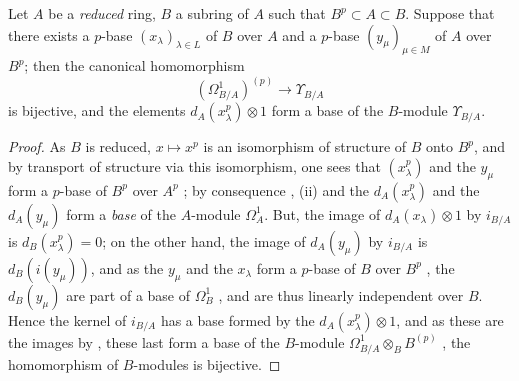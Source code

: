 \begin{proposition}[21.3.5]
\label{0.21.3.5}
Let $A$ be a \emph{reduced} ring, $B$ a subring of $A$ such that $B^p\subset A\subset B$.
Suppose that there exists a $p$-base $(x_\lambda)_{\lambda\in L}$ of $B$ over $A$ and a $p$-base $(y_\mu)_{\mu\in M}$ of $A$ over $B^p$; then the canonical homomorphism 
\begin{equation}
\tag{21.3.5.1}
  \label{0.21.3.5.1}
  (\Omega^1_{B/A})^{(p)}\to\Upsilon_{B/A}
\end{equation}
is bijective, and the elements $d_A(x^p_\lambda)\otimes 1$ form a base of the $B$-module $\Upsilon_{B/A}$.
\end{proposition}

\begin{proof}
As $B$ is reduced, $x\mapsto x^p$ is an isomorphism of structure of $B$ onto $B^p$, and by transport of structure via this isomorphism, one sees that $(x^p_\lambda)$ and the $y_\mu$ form a $p$-base of $B^p$ over $A^p$ ; by consequence , (ii) and  the $d_A(x^p_\lambda)$ and the $d_A(y_\mu)$ form a \emph{base} of the $A$-module $\Omega^1_A$.
But, the image of $d_A(x_\lambda)\otimes 1$ by $i_{B/A}$ is $d_B(x^p_\lambda)=0$; on the other hand, the image of $d_A(y_\mu)$ by $i_{B/A}$ is $d_B(i(y_\mu))$, and as the $y_\mu$ and the $x_\lambda$ form a $p$-base of $B$ over $B^p$ , the $d_B(y_\mu)$ are part of a base of $\Omega^1_B$ , and are thus linearly independent over $B$.
Hence the kernel of $i_{B/A}$ has a base formed by the $d_A(x^p_\lambda)\otimes 1$, and as these are the images by , these last form a base of the $B$-module $\Omega^1_{B/A}\otimes_B B^{(p)}$ , the homomorphism  of $B$-modules is bijective.
\end{proof}

